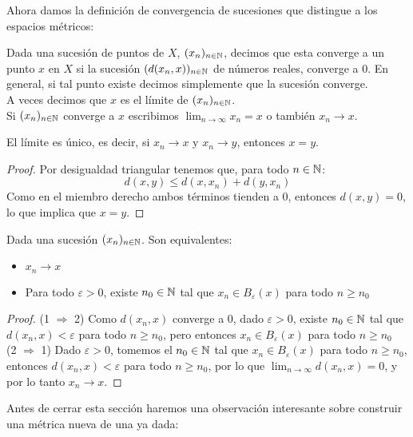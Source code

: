 \documentclass[12pt,a4paper]{book}
\begin{document}
Ahora damos la definición de convergencia de sucesiones que distingue a los espacios métricos:
\begin{defi} Dada una sucesión de puntos de $X$, $(x_n)_{{{n} \in \mathbb{N}}}$, decimos que esta converge a un punto $x$ en $X$ si la sucesión $(d(x_n,x))_{{{n} \in \mathbb{N}}}$ de números reales, converge a 0. En general, si tal punto existe decimos simplemente que la sucesión converge.\\
A veces decimos que $x$ es el límite de $(x_n)_{{{n} \in \mathbb{N}}}$.\\
Si $(x_n)_{{{n} \in \mathbb{N}}}$ converge a $x$ escribimos $\lim_{n \to \infty} x_n = x$ o también $ x_n \rightarrow x$.
\end{defi}
\begin{prop} El límite es único, es decir, si $x_n \rightarrow x$ y $x_n \rightarrow y$, entonces $x =y$.
\begin{proof}
Por desigualdad triangular tenemos que, para todo $n \in \mathbb{N}$:
$$ d(x,y) \leq d(x,x_n) + d(y,x_n)$$
Como en el miembro derecho ambos términos tienden a 0, entonces $d(x,y)=0$, lo que implica que $x=y$.
\end{proof}
\end{prop}
\begin{prop}
Dada una sucesión $(x_n)_{{{n} \in \mathbb{N}}}$. Son equivalentes:
\begin{itemize}
\item[1] $x_n \rightarrow x$
\item[2] Para todo $\varepsilon > 0$, existe $n_0 \in \mathbb{N}$ tal que $x_n \in B_\varepsilon(x)$ para todo $n \geq n_0$
\end{itemize}
\begin{proof}
(1 $\Rightarrow$ 2) Como $d(x_n,x)$ converge a 0, dado $\varepsilon >0$, existe $n_0 \in \mathbb{N}$ tal que $d(x_n,x)<\varepsilon$ para todo $n \geq n_0$, pero entonces $x_n \in B_\varepsilon(x)$ para todo $n \geq n_0$\\
(2 $\Rightarrow$ 1) Dado $\varepsilon >0 $, tomemos el $n_0 \in \mathbb{N}$ tal que $x_n \in B_\varepsilon(x)$ para todo $n \geq n_0$, entonces $d(x_n,x)<\varepsilon$ para todo $n \geq n_0$, por lo que $\lim_{n \to \infty} d(x_n,x) = 0$, y por lo tanto $x_n \rightarrow x$.
\end{proof}
\end{prop}
Antes de cerrar esta sección haremos una observación interesante sobre construir una métrica nueva de una ya dada:
\end{document}
